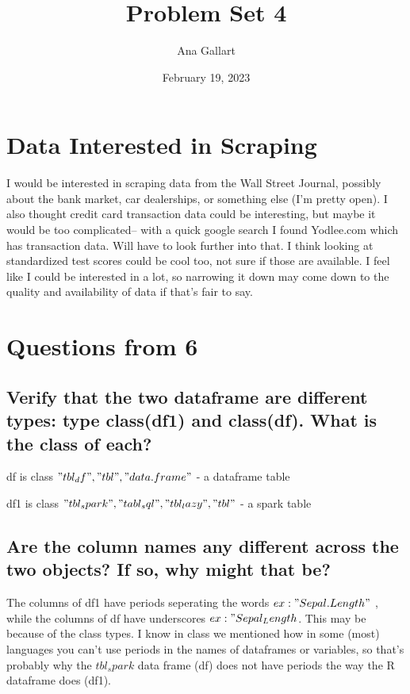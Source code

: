 \documentclass{article}
\title{Problem Set 4}
\author{Ana Gallart}
\date{February 19, 2023}
\begin{document}
\maketitle

\section{Data Interested in Scraping}
I would be interested in scraping data from the Wall Street Journal, possibly about the bank market, car dealerships, or something else (I'm pretty open). I also thought credit card transaction data could be interesting, but maybe it would be too complicated-- with a quick google search I found Yodlee.com which has transaction data. Will have to look further into that. I think looking at standardized test scores could be cool too, not sure if those are available. I feel like I could be interested in a lot, so narrowing it down may come down to the quality and availability of data if that's fair to say.

\section{Questions from 6}
\subsection{Verify that the two dataframe are different types: type class(df1) and class(df). What is the class of each?}

df is class $"tbl_df", "tbl", "data.frame"$ - a dataframe table


df1 is class $"tbl_spark", "tabl_sql", "tbl_lazy", "tbl"$ - a spark table

\subsection{Are the column names any different across the two objects? If so, why might that be?}

The columns of df1 have periods seperating the words $ex: "Sepal.Length"$ , while the columns of df have underscores $ex: "Sepal_Length$. This may be because of the class types. I know in class we mentioned how in some (most) languages you can't use periods in the names of dataframes or variables, so that's probably why the $tbl_spark$ data frame (df) does not have periods the way the R dataframe does (df1). 
\end{document}
